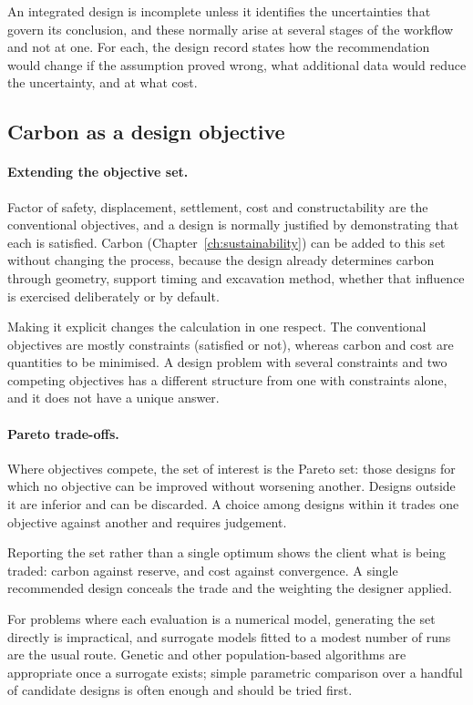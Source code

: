 An integrated design is incomplete unless it identifies the uncertainties
that govern its conclusion, and these normally arise at several stages of the
workflow and not at one. For each, the design record states how the
recommendation would change if the assumption proved wrong, what additional
data would reduce the uncertainty, and at what cost.

\subsection{Carbon as a design objective}
\label{sec:integrated-carbon}

\paragraph{Extending the objective set.}
\label{sec:objective-set}
Factor of safety, displacement, settlement, cost and constructability are the
conventional objectives, and a design is normally justified by demonstrating
that each is satisfied. Carbon (Chapter~\ref{ch:sustainability}) can be
added to this set without changing the process, because the design already
determines carbon through geometry, support timing and excavation method,
whether that influence is exercised deliberately or by default.

Making it explicit changes the calculation in one respect. The conventional
objectives are mostly constraints (satisfied or not), whereas carbon and
cost are quantities to be minimised. A design problem with several constraints
and two competing objectives has a different structure from one with
constraints alone, and it does not have a unique answer.

\paragraph{Pareto trade-offs.}
\label{sec:integrated-pareto}
Where objectives compete, the set of interest is the Pareto set: those designs
for which no objective can be improved without worsening another. Designs
outside it are inferior and can be discarded. A choice among designs within it
trades one objective against another and requires judgement.

Reporting the set rather than a single optimum shows the client what is
being traded: carbon against reserve, and cost against convergence. A single
recommended design conceals the trade and the weighting
the designer applied.

For problems where each evaluation is a numerical model, generating the set
directly is impractical, and surrogate models fitted to a modest number of
runs are the usual route. Genetic and other population-based algorithms are
appropriate once a surrogate exists; simple parametric comparison over a
handful of candidate designs is often enough and should be tried first.

